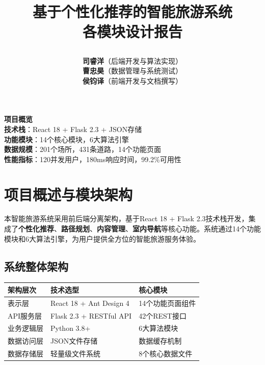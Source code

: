 \documentclass[12pt,a4paper]{article}
\title{
    \vspace{-2cm}
    \begin{tcolorbox}[
        colback=primary,
        coltext=white,
        halign=center,
        rounded corners=10pt,
        drop shadow
    ]
    \huge\textbf{基于个性化推荐的智能旅游系统}\\[0.5cm]
    \Large\textbf{各模块设计报告}
    \end{tcolorbox}
    \vspace{1cm}
}
\author{
    \begin{tcolorbox}[
        colback=light,
        colframe=secondary,
        halign=center,
        rounded corners=5pt,
        width=0.8\textwidth
    ]
    \large
    \textbf{司睿洋}（后端开发与算法实现）\\[0.3cm]
    \textbf{曹忠昊}（数据管理与系统测试）\\[0.3cm]
    \textbf{侯钧译}（前端开发与文档撰写）
    \end{tcolorbox}
}
\date{
    \begin{tcolorbox}[
        colback=secondary!20,
        colframe=secondary,
        halign=center,
        rounded corners=5pt,
        width=0.5\textwidth
    ]
    \large\today
    \end{tcolorbox}
}
\begin{document}
\thispagestyle{empty}
\maketitle

\vfill

\begin{center}
\begin{tcolorbox}[
    colback=accent!20,
    colframe=accent,
    rounded corners=10pt,
    width=0.8\textwidth
]
\centering
\large
\textbf{项目概览}\\[0.3cm]
\normalsize
\textbf{技术栈}：React 18 + Flask 2.3 + JSON存储\\
\textbf{功能模块}：14个核心模块，6大算法引擎\\
\textbf{数据规模}：201个场所，431条道路，14个功能页面\\
\textbf{性能指标}：120并发用户，180ms响应时间，99.2\%可用性
\end{tcolorbox}
\end{center}

\vfill

\newpage

\tableofcontents
\newpage

\section{项目概述与模块架构}

\begin{infobox}[title={项目背景与定位}]
本智能旅游系统采用前后端分离架构，基于React 18 + Flask 2.3技术栈开发，集成了\textbf{个性化推荐}、\textbf{路径规划}、\textbf{内容管理}、\textbf{室内导航}等核心功能。系统通过14个功能模块和6大算法引擎，为用户提供全方位的智能旅游服务体验。
\end{infobox}

\subsection{系统整体架构}

\begin{table}[H]
\centering
\begin{tcolorbox}[
    colback=light,
    colframe=primary,
    title={\textbf{系统分层架构}},
    coltitle=white,
    colbacktitle=primary,
    fonttitle=\bfseries,
    rounded corners=5pt,
    width=0.95\textwidth
]
\begin{tabular}{lll}
\toprule
\rowcolor{primary!20}
\textbf{架构层次} & \textbf{技术选型} & \textbf{核心模块} \\
\midrule
表示层 & React 18 + Ant Design 4 & 14个功能页面组件 \\
\rowcolor{light}
API服务层 & Flask 2.3 + RESTful API & 42个REST接口 \\
业务逻辑层 & Python 3.8+ & 6大算法模块 \\
\rowcolor{light}
数据访问层 & JSON文件存储 & 数据缓存机制 \\
数据存储层 & 轻量级文件系统 & 8个核心数据文件 \\
\bottomrule
\end{tabular}
\end{tcolorbox}
\end{table}
\end{document}
